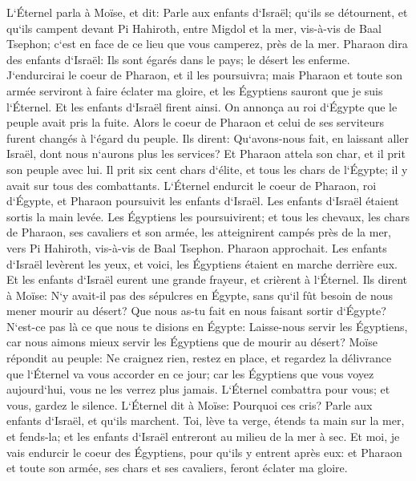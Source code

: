 \verse L`Éternel parla à Moïse, et dit: 
\verse Parle aux enfants d`Israël; qu`ils se détournent, et qu`ils campent devant Pi Hahiroth, entre Migdol et la mer, vis-à-vis de Baal Tsephon; c`est en face de ce lieu que vous camperez, près de la mer. 
\verse Pharaon dira des enfants d`Israël: Ils sont égarés dans le pays; le désert les enferme. 
\verse J`endurcirai le coeur de Pharaon, et il les poursuivra; mais Pharaon et toute son armée serviront à faire éclater ma gloire, et les Égyptiens sauront que je suis l`Éternel. Et les enfants d`Israël firent ainsi. 
\verse On annonça au roi d`Égypte que le peuple avait pris la fuite. Alors le coeur de Pharaon et celui de ses serviteurs furent changés à l`égard du peuple. Ils dirent: Qu`avons-nous fait, en laissant aller Israël, dont nous n`aurons plus les services? 
\verse Et Pharaon attela son char, et il prit son peuple avec lui. 
\verse Il prit six cent chars d`élite, et tous les chars de l`Égypte; il y avait sur tous des combattants. 
\verse L`Éternel endurcit le coeur de Pharaon, roi d`Égypte, et Pharaon poursuivit les enfants d`Israël. Les enfants d`Israël étaient sortis la main levée. 
\verse Les Égyptiens les poursuivirent; et tous les chevaux, les chars de Pharaon, ses cavaliers et son armée, les atteignirent campés près de la mer, vers Pi Hahiroth, vis-à-vis de Baal Tsephon. 
\verse Pharaon approchait. Les enfants d`Israël levèrent les yeux, et voici, les Égyptiens étaient en marche derrière eux. Et les enfants d`Israël eurent une grande frayeur, et crièrent à l`Éternel. 
\verse Ils dirent à Moïse: N`y avait-il pas des sépulcres en Égypte, sans qu`il fût besoin de nous mener mourir au désert? Que nous as-tu fait en nous faisant sortir d`Égypte? 
\verse N`est-ce pas là ce que nous te disions en Égypte: Laisse-nous servir les Égyptiens, car nous aimons mieux servir les Égyptiens que de mourir au désert? 
\verse Moïse répondit au peuple: Ne craignez rien, restez en place, et regardez la délivrance que l`Éternel va vous accorder en ce jour; car les Égyptiens que vous voyez aujourd`hui, vous ne les verrez plus jamais. 
\verse L`Éternel combattra pour vous; et vous, gardez le silence. 
\verse L`Éternel dit à Moïse: Pourquoi ces cris? Parle aux enfants d`Israël, et qu`ils marchent. 
\verse Toi, lève ta verge, étends ta main sur la mer, et fends-la; et les enfants d`Israël entreront au milieu de la mer à sec. 
\verse Et moi, je vais endurcir le coeur des Égyptiens, pour qu`ils y entrent après eux: et Pharaon et toute son armée, ses chars et ses cavaliers, feront éclater ma gloire. 
